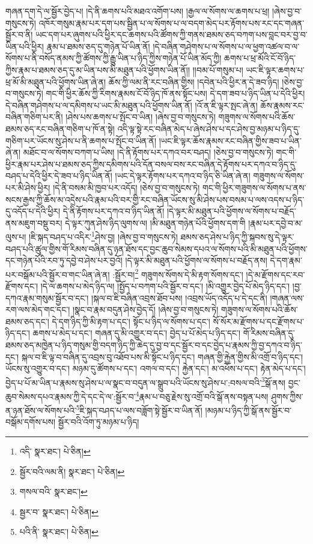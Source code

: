 གཞན་དག་དེ་ལ་སྦྱོར་བྱེད་པ། །དེ་ནི་ཆགས་པའི་མཐའ་འགོག་པས། །རྒྱལ་ལ་སོགས་ལ་ཆགས་པ་ཕྲ། །ཞེས་བྱ་བ་གསུངས་ཏེ། འཁོར་གསུམ་རྣམ་པར་དག་པས་སྦྱིན་པ་ལ་སོགས་པ་ལ་བདག་མེད་པར་རྟོགས་པས་རང་དང་གཞན་སྦྱོར་བ་ནི། ཡང་དག་པར་ཞུགས་པའི་ཕྱིར་དང་ཆགས་པའི་ཚོགས་ཀྱི་གནས་ཐམས་ཅད་བཀག་པས་བླང་བར་བྱ་བ་ཡིན་པའི་ཕྱིར། རྣམ་པ་ཐམས་ཅད་དུ་གཉེན་པོ་ཡིན་ནོ། །དེ་བཞིན་གཤེགས་པ་ལ་སོགས་པ་ལ་ཕྱག་འཚལ་བ་ལ་སོགས་པ་ནི་བསོད་ནམས་ཀྱི་ཚོགས་ཀྱི་རྒྱུ་ཡིན་པ་ཉིད་ཀྱིས་གཉེན་པོ་ཡིན་མོད་ཀྱི། ཆགས་པ་ཕྲ་མོའི་ངོ་བོ་ཉིད་ཀྱིས་རྣམ་པ་ཐམས་ཅད་དུ་མ་ཡིན་པས་མི་མཐུན་པའི་ཕྱོགས་ཡིན་ནོ།། །།བམ་པོ་གསུམ་པ། ཡང་ཇི་ལྟར་ཆགས་པ་ཕྲ་མོ་མི་མཐུན་པའི་ཕྱོགས་ཡིན་ཞེ་ན། ཆོས་ཀྱི་ལམ་ནི་རང་བཞིན་གྱིས། །དབེན་པའི་ཕྱིར་ན་དེ་ཟབ་ཉིད། །ཅེས་བྱ་བ་གསུངས་ཏེ། གང་གི་ཕྱིར་ཆོས་ཀྱི་རིགས་རྣམས་ངོ་བོ་ཉིད་ཁོ་ནས་སྟོང་པས། དེ་དག་ཟབ་པ་ཉིད་ཡིན་པ་དེའི་ཕྱིར། དེ་བཞིན་གཤེགས་པ་ལ་དམིགས་པ་ཡང་མི་མཐུན་པའི་ཕྱོགས་ཡིན་ནོ། །འོ་ན་ཇི་ལྟར་སྤང་ཞེ་ན། ཆོས་རྣམས་རང་བཞིན་གཅིག་པར་ནི། །ཤེས་པས་ཆགས་པ་སྤོང་བ་ཡིན། །ཞེས་བྱ་བ་གསུངས་ཏེ། གཟུགས་ལ་སོགས་པའི་ཆོས་ཐམས་ཅད་རང་བཞིན་གཅིག་པ་ཁོ་ན་སྟེ། འདི་ལྟ་སྟེ་རང་བཞིན་མེད་པ་ཞེས་ཤེས་པ་དང་ཤེས་བྱ་མཉམ་པ་ཉིད་དུ་གཅིག་པར་ཡོངས་སུ་ཤེས་པ་ནི་ཆགས་པ་སྤོང་བ་ཡིན་ནོ། །ཡང་ཇི་ལྟར་ཆོས་རྣམས་རང་བཞིན་གྱིས་ཟབ་པ་ཡིན་ཞེ་ན། མཐོང་བ་ལ་སོགས་བཀག་པ་ཡིས། །དེ་ནི་རྟོགས་པར་དཀའ་བར་བཤད། །ཅེས་བྱ་བ་གསུངས་ཏེ། གང་གི་ཕྱིར་རྣམ་པར་ཤེས་པ་ཐམས་ཅད་ཀྱིས་དམིགས་པའི་དོན་བསལ་བས་རང་བཞིན་དེ་རྟོགས་པར་དཀའ་བ་ཉིད་དུ་བཤད་པ་དེའི་ཕྱིར་དེ་ཟབ་པ་ཉིད་ཡིན་ནོ། །ཡང་དེ་ལྟར་རྟོགས་པར་དཀའ་བ་ཉིད་ཅི་ཡིན་ཞེ་ན། གཟུགས་ལ་སོགས་པར་མི་ཤེས་ཕྱིར། །དེ་ནི་བསམ་མི་ཁྱབ་པར་འདོད། །ཅེས་བྱ་བ་གསུངས་ཏེ། གང་གི་ཕྱིར་གཟུགས་ལ་སོགས་པ་ནས་སངས་རྒྱས་ཀྱི་ཆོས་མ་འདྲེས་པའི་རྣམ་པའི་བར་གྱི་རང་བཞིན་ཡོངས་སུ་མི་ཤེས་པས་བསམ་པ་ལས་འདས་པ་ཉིད་དུ་འདོད་པ་དེའི་ཕྱིར། དེ་ནི་རྟོགས་པར་དཀའ་བ་ཉིད་ཡིན་ནོ། །དེ་ལྟར་མི་མཐུན་པའི་ཕྱོགས་ལ་སོགས་པ་བརྗོད་ནས་མཇུག་བསྡུ་བར། དེ་ལྟར་ཀུན་ཤེས་ཉིད་ལུགས་ལ། །མི་མཐུན་གཉེན་པོའི་ཕྱོགས་དག་གི །རྣམ་པར་དབྱེ་བ་མ་ལུས་པ། །ཇི་སྐད་བཤད་པ་འདིར་\footnote{འདི་  སྣར་ཐང་།  པེ་ཅིན། }ཤེས་བྱ། །ཞེས་བྱ་བ་གསུངས་ཏེ། ཐམས་ཅད་ཤེས་པ་ཉིད་ཀྱི་སྐབས་སུ་དེ་ལྟར་བཤད་པའི་ཚུལ་གྱིས་གོ་རིམས་བཞིན་དུ་ཉན་ཐོས་དང་བྱང་ཆུབ་སེམས་དཔའ་ལ་སོགས་པའི་མི་མཐུན་པའི་ཕྱོགས་དང་གཉེན་པོའི་རབ་ཏུ་དབྱེ་བ་ཤེས་པར་བྱའོ། །དེ་ལྟར་མི་མཐུན་པའི་ཕྱོགས་ལ་སོགས་པ་བརྗོད་ནས། དེ་དག་རྣམ་པར་བསྒོམ་པའི་སྦྱོར་བ་གང་ཡིན་ཞེ་ན། :སྦྱོར་བ།\footnote{སྦྱོར་བའི་ལམ་ནི།  སྣར་ཐང་།  པེ་ཅིན། } གཟུགས་སོགས་དེ་མི་རྟག་སོགས་དང་། །དེ་མ་རྫོགས་དང་རབ་རྫོགས་དང་། །དེ་ལ་ཆགས་པ་མེད་ཉིད་ལ། །སྤྱོད་པ་བཀག་པའི་སྦྱོར་བ་དང་། །མི་འགྱུར་བྱེད་པོ་མེད་ཉིད་དང་། །བྱ་དཀའ་རྣམ་གསུམ་སྦྱོར་བ་དང་། །སྐལ་བ་ཇི་བཞིན་འབྲས་ཐོབ་པས། །འབྲས་ཡོད་འདོད་པ་དེ་དང་ནི། །གཞན་ལས་རག་ལས་མེད་གང་དང་། །སྣང་བ་རྣམ་བདུན་ཤེས་བྱེད་དོ། །ཞེས་བྱ་བ་གསུངས་ཏེ། གཟུགས་ལ་སོགས་པའི་ཆོས་ཐམས་ཅད་དང་། དེ་དག་ཉིད་ཀྱི་མི་རྟག་པ་དང་། སྟོང་པ་ཉིད་ལ་སོགས་པ་དང་། སོ་སོར་མ་རྫོགས་པ་དང་རྫོགས་པ་ཉིད་དང་། ཆགས་པ་མེད་པ་དང་། གཞན་དུ་མི་འགྱུར་བ་དང་། བྱེད་པ་པོ་མེད་པ་ཉིད་དང་། གོ་རིམས་བཞིན་དུ་ཐམས་ཅད་མཁྱེན་པ་ཉིད་གསུམ་གྱི་བདག་ཉིད་ཀྱི་ཆེད་དུ་བྱ་བ་དང་སྦྱོར་བ་དང་བྱེད་པ་རྣམས་ཀྱི་བྱ་དཀའ་བ་ཉིད་དང་། སྐལ་བ་ཇི་ལྟ་བ་བཞིན་དུ་འབྲས་བུ་འཐོབ་པས་མི་སྟོང་པ་ཉིད་དང་། གཞན་གྱི་རྐྱེན་གྱིས་མི་འགྲོ་བ་ཉིད་དང་། ཡོངས་སུ་འགྱུར་བ་དང་། མཉམ་དུ་ཚོགས་པ་དང་། འགལ་བ་དང་། རྐྱེན་དང་། མ་འཕོས་པ་དང་། རྟེན་མེད་པ་དང་། བྱེད་པ་པོ་མ་ཡིན་པ་རྣམས་སུ་ཤེས་པ་ལ་སྣང་བ་བདུན་ལ་སྒྲུབ་པའི་ཡོངས་སུ་ཤེས་པ་:བསལ་བའི་\footnote{གསལ་བའི་  སྣར་ཐང་། }སྒོ་ནས། བྱང་ཆུབ་སེམས་དཔའ་རྣམས་ཀྱི་དེ་དང་དེ་ལ་:སྦྱོར་བ་\footnote{སྦྱར་བ་  སྣར་ཐང་།  པེ་ཅིན། }རྣམ་པ་བཅུ་རྗེས་སུ་འགྲོ་བའི་སྒོ་ནས་བསྟན་པས། ཤུགས་ཀྱིས་ན་ཉན་ཐོས་ལ་སོགས་པའི་\footnote{པའི་ནི་  སྣར་ཐང་།  པེ་ཅིན། }ཇི་སྐད་བཤད་པ་ལས་བཟློག་སྟེ་སྦྱོར་བ་ཡིན་ནོ། །མཉམ་པ་ཉིད་ཀྱི་སྒོ་ནས་སྦྱོར་བ་བསྒོམ་དགོས་པས། སྦྱོར་བའི་འོག་ཏུ་མཉམ་པ་ཉིད། 